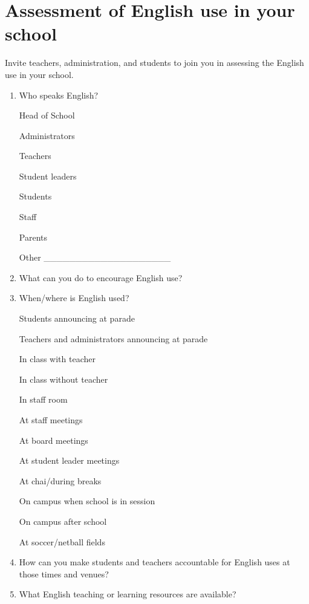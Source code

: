\section{Assessment of English use in your school}

Invite teachers, administration, and students to join you in assessing
the English use in your school.
\begin{enumerate}
\item Who speaks English?


\textbigcircle{} Head of School


\textbigcircle{} Administrators


\textbigcircle{} Teachers


\textbigcircle{} Student leaders


\textbigcircle{} Students


\textbigcircle{} Staff


\textbigcircle{} Parents


\textbigcircle{} Other \_\_\_\_\_\_\_\_\_\_\_\_\_\_\_\_\_\_\_\_

\item What can you do to encourage English use?\\[60pt]
\item When/where is English used?


\textbigcircle{} Students announcing at parade


\textbigcircle{} Teachers and administrators announcing at parade


\textbigcircle{} In class with teacher


\textbigcircle{} In class without teacher


\textbigcircle{} In staff room


\textbigcircle{} At staff meetings


\textbigcircle{} At board meetings


\textbigcircle{} At student leader meetings


\textbigcircle{} At chai/during breaks


\textbigcircle{} On campus when school is in session


\textbigcircle{} On campus after school


\textbigcircle{} At soccer/netball fields

\item How can you make students and teachers accountable for English uses
at those times and venues? \\[60pt]
\item What English teaching or learning resources are available?



\end{enumerate}
